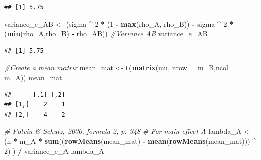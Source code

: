 \documentclass[]{book}
\newenvironment{Shaded}{\begin{snugshade}}{\end{snugshade}}
\newcommand{\CommentTok}[1]{\textcolor[rgb]{0.56,0.35,0.01}{\textit{#1}}}
\newcommand{\DataTypeTok}[1]{\textcolor[rgb]{0.13,0.29,0.53}{#1}}
\newcommand{\DecValTok}[1]{\textcolor[rgb]{0.00,0.00,0.81}{#1}}
\newcommand{\KeywordTok}[1]{\textcolor[rgb]{0.13,0.29,0.53}{\textbf{#1}}}
\newcommand{\NormalTok}[1]{#1}
\newcommand{\OperatorTok}[1]{\textcolor[rgb]{0.81,0.36,0.00}{\textbf{#1}}}
\newcommand{\StringTok}[1]{\textcolor[rgb]{0.31,0.60,0.02}{#1}}
\begin{document}
\begin{verbatim}
## [1] 5.75
\end{verbatim}

\begin{Shaded}
\begin{Highlighting}[]
\NormalTok{variance_e_AB <-}
\StringTok{  }\NormalTok{(sigma }\OperatorTok{^}\StringTok{ }\DecValTok{2} \OperatorTok{*}\StringTok{ }\NormalTok{(}\DecValTok{1} \OperatorTok{-}\StringTok{ }\KeywordTok{max}\NormalTok{(rho_A, rho_B)) }\OperatorTok{-}\StringTok{ }
\StringTok{     }\NormalTok{sigma }\OperatorTok{^}\StringTok{ }\DecValTok{2} \OperatorTok{*}\StringTok{ }\NormalTok{(}\KeywordTok{min}\NormalTok{(rho_A,rho_B) }\OperatorTok{-}\StringTok{ }\NormalTok{rho_AB)) }
\CommentTok{#Variance AB}
\NormalTok{variance_e_AB}
\end{Highlighting}
\end{Shaded}

\begin{verbatim}
## [1] 5.75
\end{verbatim}

\begin{Shaded}
\begin{Highlighting}[]
\CommentTok{#Create a mean matrix}
\NormalTok{mean_mat <-}\StringTok{ }\KeywordTok{t}\NormalTok{(}\KeywordTok{matrix}\NormalTok{(mu, }\DataTypeTok{nrow =}\NormalTok{ m_B,}\DataTypeTok{ncol =}\NormalTok{ m_A)) }
\NormalTok{mean_mat}
\end{Highlighting}
\end{Shaded}

\begin{verbatim}
##      [,1] [,2]
## [1,]    2    1
## [2,]    4    2
\end{verbatim}

\begin{Shaded}
\begin{Highlighting}[]
\CommentTok{# Potvin & Schutz, 2000, formula 2, p. 348}
\CommentTok{# For main effect A}
\NormalTok{lambda_A <-}
\StringTok{  }\NormalTok{(n }\OperatorTok{*}\StringTok{ }\NormalTok{m_A }\OperatorTok{*}\StringTok{ }\KeywordTok{sum}\NormalTok{((}\KeywordTok{rowMeans}\NormalTok{(mean_mat) }\OperatorTok{-}\StringTok{ }
\StringTok{                   }\KeywordTok{mean}\NormalTok{(}\KeywordTok{rowMeans}\NormalTok{(mean_mat))) }\OperatorTok{^}\StringTok{ }\DecValTok{2}\NormalTok{) ) }\OperatorTok{/}\StringTok{ }\NormalTok{variance_e_A}
\NormalTok{  lambda_A}
\end{Highlighting}
\end{Shaded}
\end{document}
